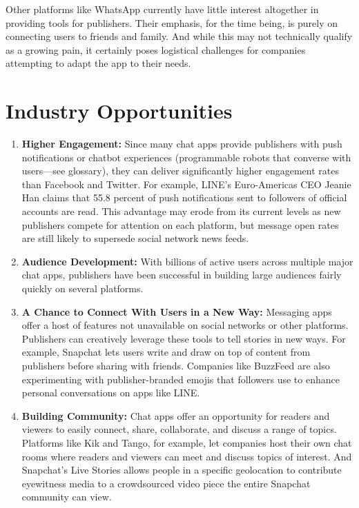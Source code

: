 \documentclass[notoc, symmetric, nobib, nols]{towcenter-guideto-book}
\begin{document}
\begin{enumerate}[itemsep=1em]
\hspace{2ex} Other platforms like WhatsApp currently have little interest altogether in providing tools for publishers. Their emphasis, for the time being, is purely on connecting users to friends and family. And while this may not technically qualify as a growing pain, it certainly poses logistical challenges for companies attempting to adapt the app to their needs.
\end{enumerate}

\section{Industry Opportunities}

\begin{enumerate}[itemsep=1em]
\item\textbf{Higher Engagement:} Since many chat apps provide publishers with push notifications or chatbot experiences (programmable robots that converse with users---see glossary), they can deliver significantly higher engagement rates than Facebook and Twitter. For example, LINE's Euro-Americas CEO Jeanie Han claims that 55.8 percent of push notifications sent to followers of official accounts are read.\autocite{BILINE} This advantage may erode from its current levels as new publishers compete for attention on each platform, but message open rates are still likely to supersede social network news feeds. 

\item\textbf{Audience Development:} With billions of active users across multiple major chat apps, publishers have been successful in building large audiences fairly quickly on several platforms.  

\item\textbf{A Chance to Connect With Users in a New Way:} Messaging apps offer a host of features not unavailable on social networks or other platforms. Publishers can creatively leverage these tools to tell stories in new ways. For example, Snapchat lets users write and draw on top of content from publishers before sharing with friends. Companies like BuzzFeed are also experimenting with publisher-branded emojis that followers use to enhance personal conversations on apps like LINE.  

\item\textbf{Building Community:} Chat apps offer an opportunity for readers and viewers to easily connect, share, collaborate, and discuss a range of topics. Platforms like Kik and Tango, for example, let companies host their own chat rooms where readers and viewers can meet and discuss topics of interest. And Snapchat's Live Stories allows people in a specific geolocation to contribute eyewitness media to a crowdsourced video piece the entire Snapchat community can view.
\end{enumerate}
  
\end{document}
